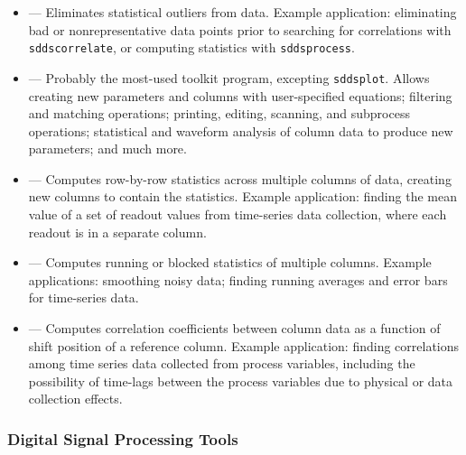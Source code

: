 \documentclass[11pt]{article}
\begin{document}
\begin{itemize}
\item {} --- Eliminates statistical outliers from data.  Example application: eliminating bad
or nonrepresentative data points prior to searching for correlations with \verb|sddscorrelate|, or computing
statistics with \verb|sddsprocess|.

\item {} --- Probably the most-used toolkit program, excepting \verb|sddsplot|.  Allows
creating new parameters and columns with user-specified equations; filtering and matching operations; printing,
editing, scanning, and subprocess operations; statistical and waveform analysis of column data to produce new
parameters; and much more.

\item {} --- Computes row-by-row statistics across multiple columns of data, creating
new columns to contain the statistics.  Example application: finding the mean value of a set of readout
values from time-series data collection, where each readout is in a separate column.

\item {} --- Computes running or blocked statistics of multiple columns.  Example
applications: smoothing noisy data; finding running averages and error bars for time-series data.

\item {} --- Computes correlation coefficients
between column data as a function of shift position of a reference
column.  Example application: finding correlations among time series
data collected from process variables, including the possibility of
time-lags between the process variables due to physical or data
collection effects.

\end{itemize}

\subsubsection{Digital Signal Processing Tools}
\end{document}
